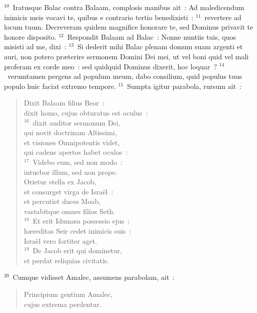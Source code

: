 ${}^{10}$~Iratusque Balac contra Balaam, complosis manibus ait~: Ad maledicendum inimicis meis vocavi te, quibus e contrario tertio benedixisti~:
${}^{11}$~revertere ad locum tuum. Decreveram quidem magnifice honorare te, sed Dominus privavit te honore disposito.
${}^{12}$~Respondit Balaam ad Balac~: Nonne nuntiis tuis, quos misisti ad me, dixi~:
${}^{13}$~Si dederit mihi Balac plenam domum suam argenti et auri, non potero pr\ae terire sermonem Domini Dei mei, ut vel boni quid vel mali proferam ex corde meo~: sed quidquid Dominus dixerit, hoc loquar~?
${}^{14}$~verumtamen pergens ad populum meum, dabo consilium, quid populus tuus populo huic faciat extremo tempore.
${}^{15}$~Sumpta igitur parabola, rursum ait~: \begin{flushleft}\begin{verse}Dixit Balaam filius Beor~:\\ dixit homo, cujus obturatus est oculus~:\\
${}^{16}$~dixit auditor sermonum Dei,\\ qui novit doctrinam Altissimi,\\ et visiones Omnipotentis videt,\\ qui cadens apertos habet oculos~:\\
${}^{17}$~Videbo eum, sed non modo~:\\ intuebor illum, sed non prope.\\ Orietur stella ex Jacob,\\ et consurget virga de Isra\"el~:\\ et percutiet duces Moab,\\ vastabitque omnes filios Seth.\\
${}^{18}$~Et erit Idum\ae a possessio ejus~:\\ h\ae reditas Seir cedet inimicis suis~:\\ Isra\"el vero fortiter aget.\\
${}^{19}$~De Jacob erit qui dominetur,\\ et perdat reliquias civitatis.\\\end{verse}\end{flushleft}


${}^{20}$~Cumque vidisset Amalec, assumens parabolam, ait~: \begin{flushleft}\begin{verse}Principium gentium Amalec,\\ cujus extrema perdentur.\end{verse}\end{flushleft}


